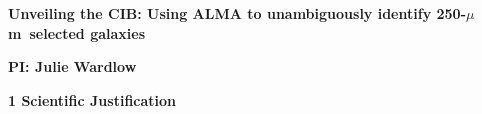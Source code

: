 \documentclass[12pt,a4paper]{article}
\newcommand{\micron}{$\mu$m}
\begin{document}
\pagestyle{plain}
 

\begin{center}
{\LARGE{\bf
{Unveiling the CIB: Using ALMA to unambiguously identify 250-\micron\
  selected galaxies}
}}
\end{center}

\centerline{\bf PI: 
{Julie Wardlow}}



{\large{\bf1 Scientific Justification}}
\end{document}
